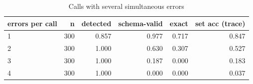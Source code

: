 \begin{table}[t]
\centering
\caption{Calls with several simultaneous errors}
\label{tab:multi_error}
\begin{tabular}{lrrrrr}
\hline
errors per call & n & detected & schema-valid & exact & set acc (trace) \\
\hline
1 & 300 & 0.857 & 0.977 & 0.717 & 0.847 \\
2 & 300 & 1.000 & 0.630 & 0.307 & 0.527 \\
3 & 300 & 1.000 & 0.187 & 0.000 & 0.183 \\
4 & 300 & 1.000 & 0.000 & 0.000 & 0.037 \\
\hline
\end{tabular}
\end{table}
